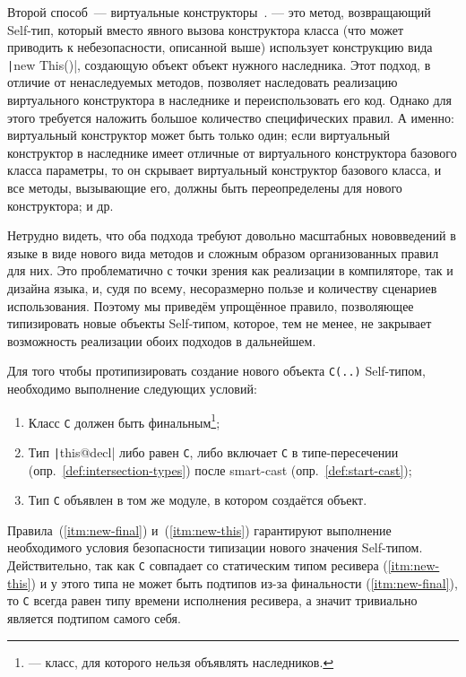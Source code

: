 Второй способ~--- виртуальные конструкторы~\cite{ryu2016thistype}.
 --- это метод, возвращающий Self-тип, который вместо явного вызова конструктора класса (что может приводить к небезопасности, описанной выше) использует конструкцию вида \texttt|new This()|, создающую объект объект нужного наследника.
Этот подход, в отличие от ненаследуемых методов, позволяет наследовать реализацию виртуального конструктора в наследнике и переиспользовать его код.
Однако для этого требуется наложить большое количество специфических правил.
А именно: виртуальный конструктор может быть только один; если виртуальный конструктор в наследнике имеет отличные от виртуального конструктора базового класса параметры, то он скрывает виртуальный конструктор базового класса, и все методы, вызывающие его, должны быть переопределены для нового конструктора; и др.

Нетрудно видеть, что оба подхода требуют довольно масштабных нововведений в языке в виде нового вида методов и сложным образом организованных правил для них.
Это проблематично с точки зрения как реализации в компиляторе, так и дизайна языка, и, судя по всему, несоразмерно пользе и количеству сценариев использования.
Поэтому мы приведём упрощённое правило, позволяющее типизировать новые объекты Self-типом, которое, тем не менее, не закрывает возможность реализации обоих подходов в дальнейшем.

Для того чтобы протипизировать создание нового объекта \texttt{C(..)} Self-типом, необходимо выполнение следующих условий:

\begin{enumerate}
    \item \label{itm:new-final} Класс \texttt{C} должен быть финальным\footnote{ --- класс, для которого нельзя объявлять наследников.};
    \item \label{itm:new-this} Тип \texttt|this@decl| либо равен \texttt{С}, либо включает \texttt{C} в типе-пересечении (опр.~\ref{def:intersection-types}) после smart-cast (опр.~\ref{def:start-cast});
    \item \label{itm:new-module} Тип \texttt{C} объявлен в том же модуле, в котором создаётся объект.
\end{enumerate}

Правила~(\ref{itm:new-final}) и~(\ref{itm:new-this}) гарантируют выполнение необходимого условия безопасности типизации нового значения Self-типом.
Действительно, так как \texttt{C} совпадает со статическим типом ресивера (\ref{itm:new-this}) и у этого типа не может быть подтипов из-за финальности (\ref{itm:new-final}), то \texttt{C} всегда равен типу времени исполнения ресивера, а значит тривиально является подтипом самого себя.

